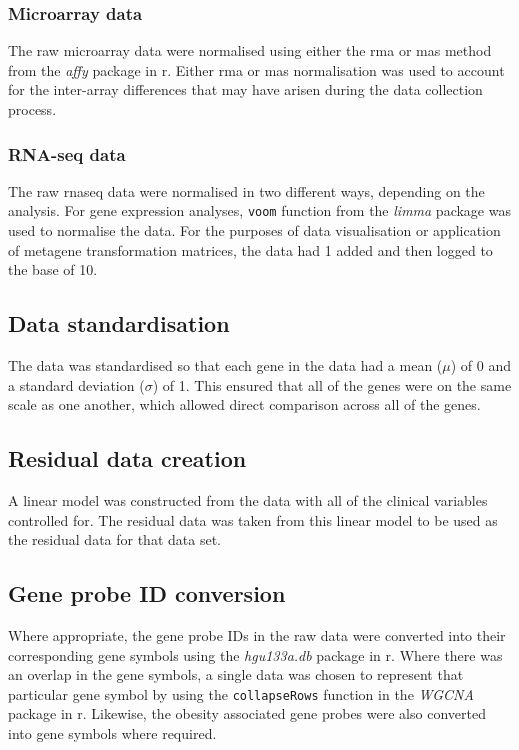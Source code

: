 \subsubsection{Microarray data}
\label{ssub:microarray_data}

The raw microarray data were normalised using either the \gls{rma} or \gls{mas} method from the \textit{affy} package in \gls{r}.
Either \gls{rma} or \gls{mas} normalisation was used to account for the inter-array differences that may have arisen during the data collection process.

\subsubsection{RNA-seq data}
\label{ssub:rna_seq_data}

The raw \gls{rnaseq} data were normalised in two different ways, depending on the analysis.
For gene expression analyses, \texttt{voom} function from the \textit{limma} package was used to normalise the data.
For the purposes of data visualisation or application of metagene transformation matrices, the data had 1 added and then logged to the base of 10.

\subsection{Data standardisation}
\label{sub:data_standardisation}

The data was standardised so that each gene in the data had a mean ($\mu$) of 0 and a standard deviation ($\sigma$) of 1.
This ensured that all of the genes were on the same scale as one another, which allowed direct comparison across all of the genes.

\subsection{Residual data creation}
\label{sub:residual_data_creation}

A linear model was constructed from the data with all of the clinical variables controlled for.
The residual data was taken from this linear model to be used as the residual data for that data set.

\subsection{Gene probe ID conversion}
\label{sub:gene_probe_id_conversion}

Where appropriate, the gene probe IDs in the raw data were converted into their corresponding gene symbols using the \textit{hgu133a.db} package in \gls{r}.
Where there was an overlap in the gene symbols, a single data was chosen to represent that particular gene symbol by using the \texttt{collapseRows} function in the \textit{WGCNA} package in \gls{r}.
Likewise, the obesity associated gene probes were also converted into gene symbols where required.


